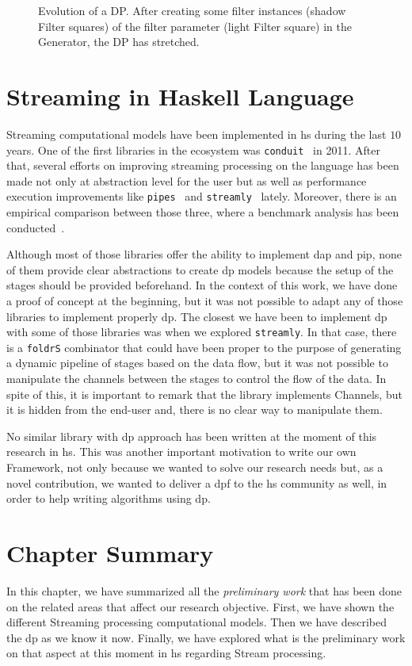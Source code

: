 \begin{figure}[h]
 \centering
 \caption[Evolution of DP]{Evolution of a DP. After creating some filter instances (shadow Filter squares) of the filter parameter (light Filter square) in the Generator, the DP has stretched.}
\label{fig:activeDP}
\end{figure}


\section{Streaming in Haskell Language}
Streaming computational models have been implemented in \acrfull{hs} during the last $10$ years. One of the first libraries in the ecosystem was \texttt{conduit}~\cite{conduit} in 2011.
After that, several efforts on improving streaming processing on the language has been made not only at abstraction level for the user but as well as performance execution 
improvements like \texttt{pipes}~\cite{pipes} and \texttt{streamly}~\cite{streamly} lately.
Moreover, there is an empirical comparison between those three, where a benchmark analysis has been conducted~\cite{benchstreamhs}.

Although most of those libraries offer the ability to implement \acrshort{dap} and \acrshort{pip}, none of them provide clear abstractions to create \acrshort{dp} models because
the setup of the stages should be provided beforehand. In the context of this work, we have done a proof of concept at the beginning, 
but it was not possible to adapt any of those libraries to implement properly \acrshort{dp}. 
The closest we have been to implement \acrshort{dp} with some of those libraries was when we explored \texttt{streamly}.
In that case, there is a \texttt{foldrS} combinator that could have been proper to the purpose of generating a dynamic pipeline of stages based on the data flow, but it was not possible to manipulate the channels between the stages to control the flow of the data. 
In spite of this, it is important to remark that the library implements Channels, but it is hidden from the end-user and, there is no clear way to manipulate them.

No similar library with \acrshort{dp} approach has been written at the moment of this research in \acrlong{hs}. 
This was another important motivation to write our own Framework, not only because we wanted to solve our research needs but, as a novel contribution, we wanted to deliver a \acrshort{dpf} to the \acrshort{hs} community as well, in order to help writing algorithms using \acrshort{dp}. 

\section{Chapter Summary}
In this chapter, we have summarized all the \emph{preliminary work} that has been done on the related areas that affect our research objective.
First, we have shown the different Streaming processing computational models. Then we have described the \acrshort{dp} as we know it now. 
Finally, we have explored what is the preliminary work on that aspect at this moment in \acrshort{hs} regarding Stream processing. 
